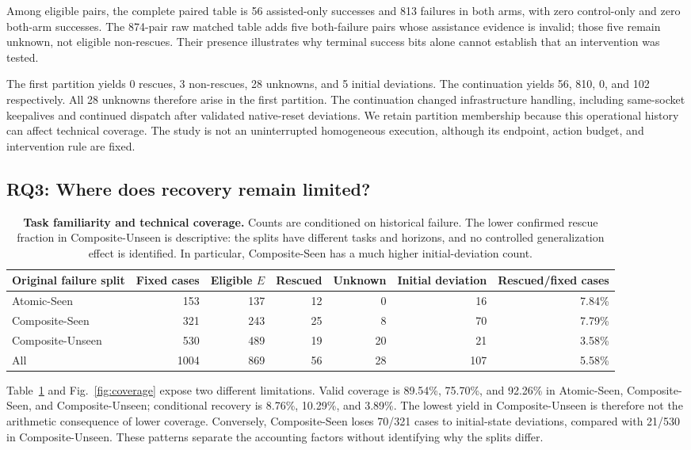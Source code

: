 \documentclass[10pt,twocolumn,letterpaper]{article}
\begin{document}
Among eligible pairs, the complete paired table is 56 assisted-only successes and 813 failures in both arms, with zero control-only and zero both-arm successes. The 874-pair raw matched table adds five both-failure pairs whose assistance evidence is invalid; those five remain unknown, not eligible non-rescues. Their presence illustrates why terminal success bits alone cannot establish that an intervention was tested.

The first partition yields 0 rescues, 3 non-rescues, 28 unknowns, and 5 initial deviations. The continuation yields 56, 810, 0, and 102 respectively. All 28 unknowns therefore arise in the first partition. The continuation changed infrastructure handling, including same-socket keepalives and continued dispatch after validated native-reset deviations. We retain partition membership because this operational history can affect technical coverage. The study is not an uninterrupted homogeneous execution, although its endpoint, action budget, and intervention rule are fixed.



\subsection{RQ3: Where does recovery remain limited?}
\begin{table}[t]
\centering\small
\begin{tabular}{@{}lrrrrrr@{}}
\toprule
Original failure split & Fixed cases & Eligible $E$ & Rescued & Unknown & Initial deviation & Rescued/fixed cases\\
\midrule
Atomic-Seen&153&137&12&0&16&7.84\%\\
Composite-Seen&321&243&25&8&70&7.79\%\\
Composite-Unseen&530&489&19&20&21&3.58\%\\
\midrule
All&1004&869&56&28&107&5.58\%\\
\bottomrule
\end{tabular}
\caption{\textbf{Task familiarity and technical coverage.} Counts are conditioned on historical failure. The lower confirmed rescue fraction in Composite-Unseen is descriptive: the splits have different tasks and horizons, and no controlled generalization effect is identified. In particular, Composite-Seen has a much higher initial-deviation count.}
\label{tab:splits}
\end{table}
Table~\ref{tab:splits} and Fig.~\ref{fig:coverage} expose two different limitations. Valid coverage is 89.54\%, 75.70\%, and 92.26\% in Atomic-Seen, Composite-Seen, and Composite-Unseen; conditional recovery is 8.76\%, 10.29\%, and 3.89\%. The lowest yield in Composite-Unseen is therefore not the arithmetic consequence of lower coverage. Conversely, Composite-Seen loses 70/321 cases to initial-state deviations, compared with 21/530 in Composite-Unseen. These patterns separate the accounting factors without identifying why the splits differ.
\end{document}
